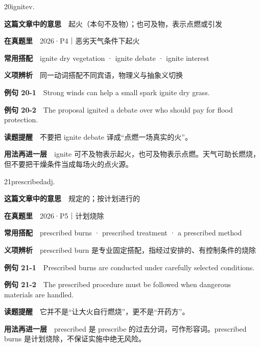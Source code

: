\documentclass[a4paper,11pt,openany]{report}
\newcommand{\emphasislabel}[1]{\textcolor{leaf}{\CJKsf\bfseries #1}}
\begin{document}
\begin{vocabbox}{20}{ignite}{v.}

\textbf{这篇文章中的意思}　起火（本句不及物）；也可及物，表示点燃或引发

\textbf{在真题里}　2026·P4｜恶劣天气条件下起火

\textbf{常用搭配}　ignite dry vegetation · ignite debate · ignite interest

\textbf{义项辨析}　同一动词搭配不同宾语，物理义与抽象义切换

\textbf{例句 20-1}　Strong winds can help a small spark ignite dry grass.

\textbf{例句 20-2}　The proposal ignited a debate over who should pay for flood protection.

\emphasislabel{读题提醒}　不要把 ignite debate 译成``点燃一场真实的火''。

\textbf{用法再进一层}　ignite 可不及物表示起火，也可及物表示点燃。天气可助长燃烧，但不要把干燥条件当成每场火的点火源。

\end{vocabbox}

\begin{vocabbox}{21}{prescribed}{adj.}

\textbf{这篇文章中的意思}　规定的；按计划进行的

\textbf{在真题里}　2026·P5｜计划烧除

\textbf{常用搭配}　prescribed burns · prescribed treatment · a prescribed method

\textbf{义项辨析}　prescribed burn 是专业固定搭配，指经过安排的、有控制条件的烧除

\textbf{例句 21-1}　Prescribed burns are conducted under carefully selected conditions.

\textbf{例句 21-2}　The prescribed procedure must be followed when dangerous materials are handled.

\emphasislabel{读题提醒}　它并不是``让大火自行燃烧''，更不是``开药方''。

\textbf{用法再进一层}　prescribed 是 prescribe 的过去分词，可作形容词。prescribed burns 是计划烧除，不保证实施中绝无风险。

\end{vocabbox}
\end{document}
